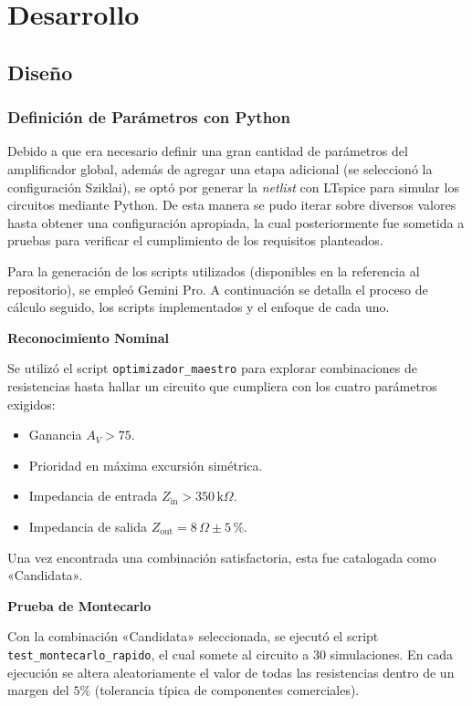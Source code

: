 \section{Desarrollo}

\subsection{Diseño}

\subsubsection{Definición de Parámetros con Python}

Debido a que era necesario definir una gran cantidad de parámetros del amplificador global, además de agregar una etapa adicional (se seleccionó la configuración Sziklai), se optó por generar la \textit{netlist} con LTspice para simular los circuitos mediante Python. De esta manera se pudo iterar sobre diversos valores hasta obtener una configuración apropiada, la cual posteriormente fue sometida a pruebas para verificar el cumplimiento de los requisitos planteados.

Para la generación de los scripts utilizados (disponibles en la referencia al repositorio), se empleó Gemini Pro. A continuación se detalla el proceso de cálculo seguido, los scripts implementados y el enfoque de cada uno.

\vspace{0.5em}
{\small\textbf{Reconocimiento Nominal}}

Se utilizó el script \texttt{optimizador\_maestro} para explorar combinaciones de resistencias hasta hallar un circuito que cumpliera con los cuatro parámetros exigidos:
\begin{itemize}
  \item Ganancia $A_V > 75$.
  \item Prioridad en máxima excursión simétrica.
  \item Impedancia de entrada $Z_{\text{in}} > 350\,\text{k}\Omega$.
  \item Impedancia de salida $Z_{\text{out}} = 8\,\Omega \pm 5\,\%$.
\end{itemize}

Una vez encontrada una combinación satisfactoria, esta fue catalogada como «Candidata».

\vspace{0.5em}
{\small\textbf{Prueba de Montecarlo}}

Con la combinación «Candidata» seleccionada, se ejecutó el script \texttt{test\_montecarlo\_rapido}, el cual somete al circuito a 30 simulaciones. En cada ejecución se altera aleatoriamente el valor de todas las resistencias dentro de un margen del $5\%$ (tolerancia típica de componentes comerciales).

